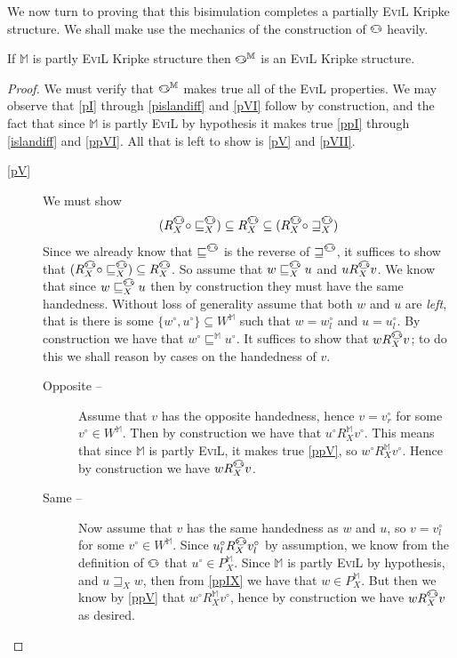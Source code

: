We now turn to proving that this bisimulation completes a partially
\textsc{EviL} Kripke structure. We shall make use the mechanics of the 
 construction of $\invis$ heavily.

\begin{theorem}\label{EviL-Completion}
If $\mathbb{M}$ is partly \textsc{EviL} Kripke structure then
$\invis^\mathbb{M}$ is an \textsc{EviL} Kripke structure. 
\end{theorem}
\begin{proof}
We must verify that $\invis^\mathbb{M}$ makes true all of the
\textsc{EviL} properties.  We may observe that \ref{pI} through
\ref{pislandiff} and \ref{pVI} follow by construction, and 
the fact that since
$\mathbb{M}$ is partly \textsc{EviL} by hypothesis it makes true \ref{ppI} through
\ref{islandiff} and \ref{ppVI}.  All that is left to show is \ref{pV}
and \ref{pVII}.

  \begin{description}
    \item[\ref{pV}] We must show
$$(R^{\invis}_X \circ \sqsubseteq^{\invis}_X) \subseteq
    R^{\invis}_X \subseteq (R^{\invis}_X \circ
    \sqsupseteq^{\invis}_X)$$
Since we already know that $\sqsubseteq^\invis$ is the reverse of
$\sqsupseteq^\invis$, it suffices to show that $(R^{\invis}_X \circ
\sqsubseteq^{\invis}_X) \subseteq   R^{\invis}_X$.  
So assume that $w  \sqsubseteq^{\invis}_X u$ and $u R^{\invis}_X v$. We know that since $w \sqsubseteq^{\invis}_X u$ then by construction
they must have the same handedness.  Without loss of generality assume
that both $w$ and $u$ are \emph{left}, that is there is some
$\{w^\circ,u^\circ\} \subseteq W^\mathbb{M}$ such that $w = w^\circ_l$
and $u = u^\circ_l$. By construction we have that $w^\circ
\sqsubseteq^\mathbb{M} u^\circ$.  It suffices to show that $w R_X^\invis
v$; to do this we shall reason by cases on the handedness of $v$.
  \begin{description}
\item[Opposite --] Assume that $v$ has the opposite handedness, hence $v = v^\circ_r$ for
some $v^\circ\in W^\mathbb{M}$. Then by construction we have that
$u^\circ R_X^\mathbb{M} v^\circ$.  This means that since
$\mathbb{M}$ is partly \textsc{EviL}, it makes true \ref{ppV}, so $w^\circ
R_X^\mathbb{M} v^\circ$.  Hence by construction we have $w R^\invis_X v$.
\item[Same --]  Now assume that $v$ has the same handedness as $w$ and
  $u$, so $v = v^\circ_l$ for some $v^\circ\in W^\mathbb{M}$.  Since
  $u^\circ_l R^\invis_X v^\circ_l$ by assumption, we know from the
  definition of $\invis$ that $u^\circ \in P_X^\mathbb{M}$.  Since
  $\mathbb{M}$ is partly \textsc{EviL} by hypothesis, and $u
  \sqsupseteq_X w$, then from \ref{ppIX} we have that $w \in
  P_X^\mathbb{M}$.  But then we know by \ref{ppV} that $w^\circ
  R^\mathbb{M}_X v^\circ$, hence by construction we have
   $w R^\invis_X v$ as desired.
\end{description}


\end{description}
\end{proof}
